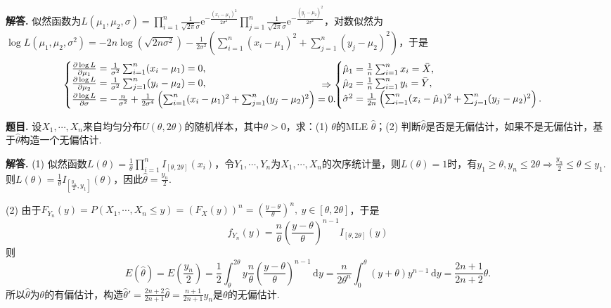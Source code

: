 \documentclass[12pt, a4paper, oneside]{ctexart}
\newcounter{problem}  %
\newcounter{problem*}  %
\newenvironment{problem}{\stepcounter{problem}\par\noindent\textbf{题目\arabic{problem}. }}{\smallskip\par}
\newenvironment{solution}{\par\noindent\textbf{解答. }}{\smallskip\par}
\let\leq=\leqslant %
\let\geq=\geqslant %
\def\d{\mathrm{d}}          %
\def\e{\mathrm{e}}          %
\def\add{\vspace{1ex}}      %
\begin{document}
\begin{solution}
    似然函数为$L(\mu_1,\mu_2,\sigma) = \prod_{i=1}^n\frac{1}{\sqrt{2\pi}\sigma}\e^{-\frac{(x_i-\mu_1)^2}{2\sigma^2}}\prod_{j=1}^n\frac{1}{\sqrt{2\pi}\sigma}\e^{-\frac{(y_j-\mu_2)^2}{2\sigma^2}}$，对数似然为$\log L(\mu_1,\mu_2,\sigma^2)=-2n\log(\sqrt{2n\sigma^2})-\frac{1}{2\sigma^2}\left(\sum_{i=1}^n(x_i-\mu_1)^2+\sum_{j=1}^n(y_j-\mu_2)^2\right)$，于是
    \begin{equation*}
        \begin{cases}
            \frac{\partial \log L}{\partial \mu_1} = \frac{1}{\sigma^2}\sum_{i=1}^n(x_i-\mu_1)=0,\\
            \frac{\partial \log L}{\partial \mu_2} = \frac{1}{\sigma^2}\sum_{j=1}^n(y_i-\mu_2)=0,\\
            \frac{\partial \log L}{\partial \sigma} = -\frac{n}{\sigma^2}+\frac{1}{2\sigma^4}\left(\sum_{i=1}^n(x_i-\mu_1)^2+\sum_{j=1}^n(y_j-\mu_2)^2\right)=0.
        \end{cases}\hspace{-1cm}\Rightarrow\begin{cases}
            \hat{\mu}_1 = \frac{1}{n}\sum_{i=1}^nx_i = \bar{X},\\
            \hat{\mu}_2 = \frac{1}{n}\sum_{i=1}^ny_i = \bar{Y},\\
            \hat{\sigma}^2=\frac{1}{2n}\left(\sum_{i=1}^n(x_i-\hat{\mu}_1)^2+\sum_{j=1}^n(y_j-\mu_2)^2\right).
        \end{cases}
    \end{equation*}
\end{solution}
\begin{problem}
    设$X_1,\cdots, X_n$来自均匀分布$U(\theta,2\theta)$的随机样本，其中$\theta>0$，求：(1) $\theta$的MLE $\hat{\theta}$；(2) 判断$\hat{\theta}$是否是无偏估计，如果不是无偏估计，基于$\hat{\theta}$构造一个无偏估计.
\end{problem}
\begin{solution}
    (1) 似然函数$L(\theta) = \frac{1}{\theta}\prod_{i=1}^nI_{[\theta,2\theta]}(x_i)$，令$Y_1,\cdots,Y_n$为$X_1,\cdots,X_n$的次序统计量，\add 则$L(\theta)=1$时，有$y_1\geq \theta, y_n\leq 2\theta\Rightarrow \frac{y_n}{2}\leq \theta\leq y_1$. 则$L(\theta) = \frac{1}{\theta}I_{[\frac{y_n}{2},y_1]}(\theta)$，因此$\hat{\theta} = \frac{y_n}{2}$.

    (2) 由于$F_{Y_n}(y) = P(X_1,\cdots,X_n\leq y) = (F_X(y))^n = (\frac{y-\theta}{\theta})^{n},\ y\in [\theta, 2\theta]$，于是
    \begin{equation*}
        f_{Y_n}(y) = \frac{n}{\theta}(\frac{y-\theta}{\theta})^{n-1}I_{[\theta,2\theta]}(y)
    \end{equation*}
    则
    \begin{equation*}
        E(\hat{\theta})=E(\frac{y_n}{2})=\frac{1}{2}\int_\theta^{2\theta}y \frac{n}{\theta}(\frac{y-\theta}{\theta})^{n-1}\,\d y=\frac{n}{2\theta^n}\int_0^\theta(y+\theta)y^{n-1}\,\d y = \frac{2n+1}{2n+2}\theta.
    \end{equation*}
    所以$\hat{\theta}$为$\theta$的有偏估计，构造$\hat{\theta}'  =\frac{2n+2}{2n+1}\hat{\theta} = \frac{n+1}{2n+1}y_n$是$\theta$的无偏估计.
\end{solution}
\end{document}
